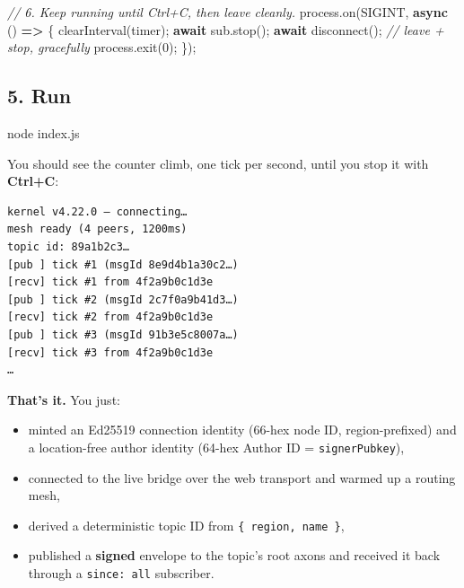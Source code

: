 \documentclass[
  nobib]{tufte-handout}
\newenvironment{Shaded}{}{}
\newcommand{\BuiltInTok}[1]{\textcolor[rgb]{0.00,0.50,0.00}{#1}}
\newcommand{\CommentTok}[1]{\textcolor[rgb]{0.38,0.63,0.69}{\textit{#1}}}
\newcommand{\ControlFlowTok}[1]{\textcolor[rgb]{0.00,0.44,0.13}{\textbf{#1}}}
\newcommand{\DecValTok}[1]{\textcolor[rgb]{0.25,0.63,0.44}{#1}}
\newcommand{\ExtensionTok}[1]{#1}
\newcommand{\FunctionTok}[1]{\textcolor[rgb]{0.02,0.16,0.49}{#1}}
\newcommand{\KeywordTok}[1]{\textcolor[rgb]{0.00,0.44,0.13}{\textbf{#1}}}
\newcommand{\NormalTok}[1]{#1}
\newcommand{\OperatorTok}[1]{\textcolor[rgb]{0.40,0.40,0.40}{#1}}
\newcommand{\PreprocessorTok}[1]{\textcolor[rgb]{0.74,0.48,0.00}{#1}}
\newcommand{\StringTok}[1]{\textcolor[rgb]{0.25,0.44,0.63}{#1}}
\providecommand{\tightlist}{%
  \setlength{\itemsep}{0pt}\setlength{\parskip}{0pt}}
\begin{document}
\begin{Shaded}
\begin{Highlighting}[]
\CommentTok{// 6. Keep running until Ctrl+C, then leave cleanly.}
\BuiltInTok{process}\OperatorTok{.}\FunctionTok{on}\NormalTok{(}\StringTok{\textquotesingle{}SIGINT\textquotesingle{}}\OperatorTok{,} \KeywordTok{async}\NormalTok{ () }\KeywordTok{=\textgreater{}}\NormalTok{ \{}
  \PreprocessorTok{clearInterval}\NormalTok{(timer)}\OperatorTok{;}
  \ControlFlowTok{await}\NormalTok{ sub}\OperatorTok{.}\FunctionTok{stop}\NormalTok{()}\OperatorTok{;}
  \ControlFlowTok{await} \FunctionTok{disconnect}\NormalTok{()}\OperatorTok{;}          \CommentTok{// leave + stop, gracefully}
  \BuiltInTok{process}\OperatorTok{.}\FunctionTok{exit}\NormalTok{(}\DecValTok{0}\NormalTok{)}\OperatorTok{;}
\NormalTok{\})}\OperatorTok{;}
\end{Highlighting}
\end{Shaded}

\subsection{5. Run}\label{run}

\begin{Shaded}
\begin{Highlighting}[]
\ExtensionTok{node}\NormalTok{ index.js}
\end{Highlighting}
\end{Shaded}

You should see the counter climb, one tick per second, until you stop it
with \textbf{Ctrl+C}:

\begin{verbatim}
kernel v4.22.0 — connecting…
mesh ready (4 peers, 1200ms)
topic id: 89a1b2c3…
[pub ] tick #1 (msgId 8e9d4b1a30c2…)
[recv] tick #1 from 4f2a9b0c1d3e
[pub ] tick #2 (msgId 2c7f0a9b41d3…)
[recv] tick #2 from 4f2a9b0c1d3e
[pub ] tick #3 (msgId 91b3e5c8007a…)
[recv] tick #3 from 4f2a9b0c1d3e
…
\end{verbatim}

\textbf{That's it.} You just:

\begin{itemize}
\tightlist
\item
  minted an Ed25519 connection identity (66-hex node ID,
  region-prefixed) and a location-free author identity (64-hex Author ID
  = \texttt{signerPubkey}),
\item
  connected to the live bridge over the web transport and warmed up a
  routing mesh,
\item
  derived a deterministic topic ID from \texttt{\{\ region,\ name\ \}},
\item
  published a \textbf{signed} envelope to the topic's root axons and
  received it back through a
  \texttt{since:\ \textquotesingle{}all\textquotesingle{}} subscriber.
\end{itemize}
\end{document}
